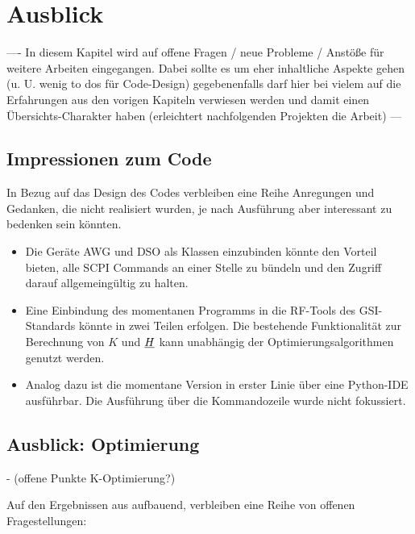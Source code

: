 \documentclass[../Report.tex]{subfiles}
\begin{document}
\chapter{Ausblick}
\label{chap:ausb}
---- In diesem Kapitel wird auf offene Fragen / neue Probleme / Anstöße für weitere Arbeiten eingegangen. Dabei sollte es um eher inhaltliche Aspekte gehen (u. U. wenig to dos für Code-Design) gegebenenfalls darf hier bei vielem auf die Erfahrungen aus den vorigen Kapiteln verwiesen werden und damit einen Übersichts-Charakter haben (erleichtert nachfolgenden Projekten die Arbeit) --- 

\section{Impressionen zum Code}
\label{sec:ausb.code}
In Bezug auf das Design des Codes verbleiben eine Reihe Anregungen und Gedanken, die nicht realisiert wurden, je nach Ausführung aber interessant zu bedenken sein könnten.

\begin{itemize}
	\item	Die Geräte AWG und DSO als Klassen einzubinden könnte den Vorteil bieten, alle SCPI Commands an einer Stelle zu bündeln und den Zugriff darauf allgemeingültig zu halten.
	
	\item	Eine Einbindung des momentanen Programms in die RF-Tools des GSI-Standards könnte in zwei Teilen erfolgen. Die bestehende Funktionalität zur Berechnung von $K$ und $\underline{H}$ kann unabhängig der Optimierungsalgorithmen genutzt werden. 
	
	\item 	Analog dazu ist die momentane Version in erster Linie über eine Python-IDE ausführbar. Die Ausführung über die Kommandozeile wurde nicht fokussiert.
	
	
\end{itemize}

\section{Ausblick: Optimierung}
\label{sec:ausb.opti}

- (offene Punkte K-Optimierung?)


Auf den Ergebnissen aus  aufbauend, verbleiben eine Reihe von offenen Fragestellungen:
\end{document}
